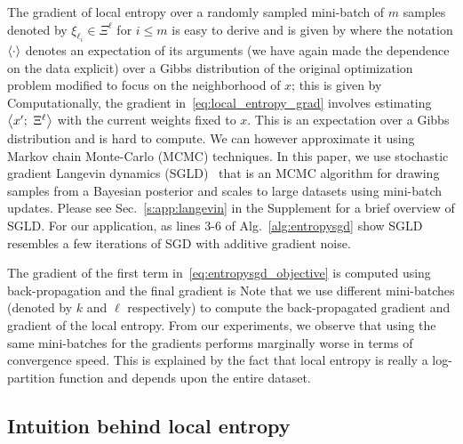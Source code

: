 \documentclass[10pt]{article}
\newcommand{\minibatch}[1]{\Xi^{#1}}
\begin{document}
The gradient of local entropy over a randomly sampled mini-batch of $m$ samples denoted by $\xi_{\ell_i} \in \minibatch{\ell}$ for $i \leq m$ is easy to derive and is given by
\beq{
    \nabla_x F\rbrac{x, \g;\ \minibatch{\ell}} = -\g\ \rbrac{x - \ag{x';\ \minibatch{\ell}}};
    \label{eq:local_entropy_grad}
}
where the notation $\left\langle\cdot\right\rangle$ denotes an expectation of its arguments (we have again made the dependence on the data explicit) over a Gibbs distribution of the original optimization problem modified to focus on the neighborhood of $x$; this is given by
Computationally, the gradient in~\eqref{eq:local_entropy_grad} involves estimating $\ag{x';\ \minibatch{\ell}}$ with the current weights fixed to $x$. This is an expectation over a Gibbs distribution and is hard to compute. We can however approximate it using Markov chain Monte-Carlo (MCMC) techniques. In this paper, we use stochastic gradient Langevin dynamics (SGLD)~\citep{welling2011bayesian} that is an MCMC algorithm for drawing samples from a Bayesian posterior and scales to large datasets using mini-batch updates. Please see Sec.~\ref{s:app:langevin} in the Supplement for a brief overview of SGLD. For our application, as lines 3-6 of Alg.~\ref{alg:entropysgd} show SGLD resembles a few iterations of SGD with additive gradient noise.

The gradient of the first term in~\eqref{eq:entropysgd_objective} is computed using back-propagation and the final gradient is
\beq{
    \r\ \rbrac{\f{1}{m}\ \sum_{i=1}^m\ \nabla f(x;\ \xi_{k_i})} + \g\ \rbrac{x - \ag{x';\ \minibatch{\ell}}}.
    \label{eq:entropysgd_grad}
}
Note that we use different mini-batches (denoted by $k$ and $\ell$ respectively) to compute the back-propagated gradient and gradient of the local entropy. From our experiments, we observe that using the same mini-batches for the gradients performs marginally worse in terms of convergence speed. This is explained by the fact that local entropy is really a log-partition function and depends upon the entire dataset.

\subsection{Intuition behind local entropy}
\label{ss:intuition_local_entropy}
\end{document}
